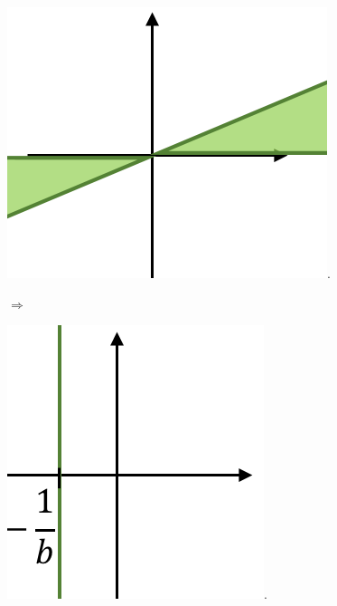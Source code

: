 \begin{figure}[!h]
	\centering
	\begin{minipage}{0.15\linewidth}
		\includegraphics[width=1\linewidth]{./bilder/Popov4.png}.
	\end{minipage}\hspace{0.05\linewidth}$\Rightarrow$\hspace{0.05\linewidth}
	\begin{minipage}{0.15\linewidth}
		\includegraphics[width=1\linewidth]{./bilder/Popov5.png}.

\end{minipage}
\end{figure}
